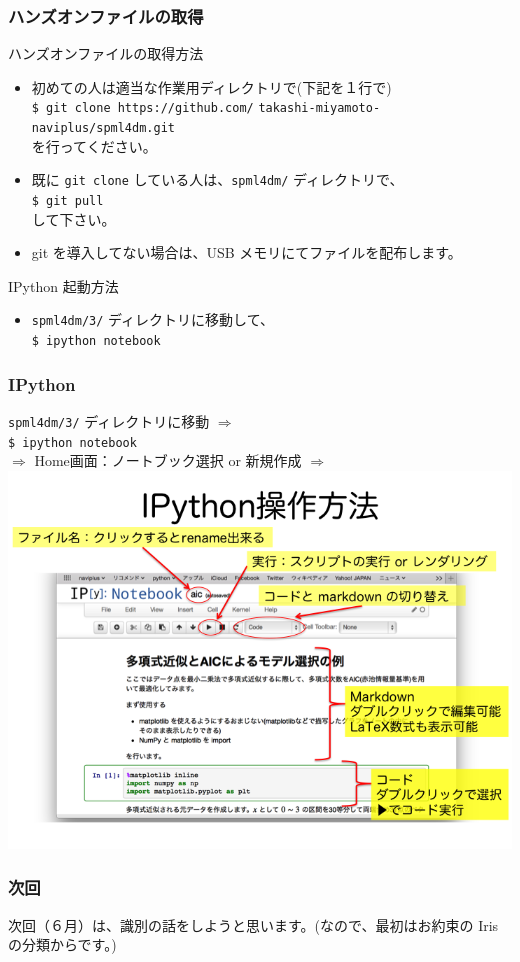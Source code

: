 \documentclass{beamer}
\begin{document}
\begin{frame}[fragile]
  \frametitle{ハンズオンファイルの取得}
  ハンズオンファイルの取得方法
  \begin{itemize}
    \item 初めての人は適当な作業用ディレクトリで(下記を１行で) \\ \texttt{\$ git clone https://github.com/} \texttt{takashi-miyamoto-naviplus/spml4dm.git} \\を行ってください。
    \item 既に \texttt{git clone} している人は、\texttt{spml4dm/} ディレクトリで、\\ \texttt{\$ git pull} \\ して下さい。
    \item git を導入してない場合は、USB メモリにてファイルを配布します。
  \end{itemize}
  IPython 起動方法
  \begin{itemize}
    \item \texttt{spml4dm/3/} ディレクトリに移動して、\\
    \texttt{\$ ipython notebook}
  \end{itemize}
\end{frame}
\begin{frame}
  \frametitle{IPython}
  \texttt{spml4dm/3/} ディレクトリに移動 $\Rightarrow$ \\
  \texttt{\$ ipython notebook} \\
  $\Rightarrow$ Home画面：ノートブック選択 or 新規作成 $\Rightarrow$ 
  \includegraphics[clip, width=\textwidth, natwidth=720, natheight=540, trim=0 0 0 75]{ipython_usage.png}
\end{frame}
\begin{frame}
  \frametitle{次回}
  次回（６月）は、識別の話をしようと思います。(なので、最初はお約束の Iris の分類からです。)
\end{frame}
\end{document}
